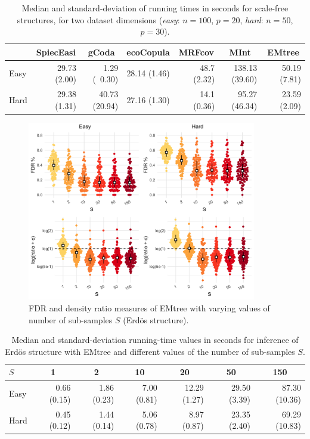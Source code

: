 \newpage

\begin{table}[ht]
\centering
\begin{tabular}{lrrrrrr}
 & \multicolumn{1}{c}{SpiecEasi} & \multicolumn{1}{c}{gCoda} & \multicolumn{1}{c}{ecoCopula} & \multicolumn{1}{c}{MRFcov} & \multicolumn{1}{c}{MInt} & \multicolumn{1}{c}{EMtree} \\ 
  \hline
Easy & 29.73  (2.00) & ~1.29  (~0.30) & 28.14  (1.46) & 48.7  (2.32) & 138.13  (39.60) & 50.19  (7.81) \\ 
  Hard & 29.38  (1.31) & 40.73  (20.94) & 27.16  (1.30) & 14.1  (0.36) & ~95.27  (46.34) & 23.59  (2.09) \\ 
   \hline
\end{tabular}
\caption{Median and standard-deviation of running times in seconds  for scale-free structures, for two dataset dimensions (\textit{easy}: $n=100$, $p=20$, \textit{hard}: $n=50$, $p=30$). }
\label{timeSF}
\end{table}

\vspace{1.5cm}

\begin{figure}[H]
    \centering
    \includegraphics[width=10cm]{figs/S_effect.png}
    \caption{FDR and density ratio measures of EMtree with varying values of number of sub-samples $S$ (Erdös structure).}
    \label{Seffect}
\end{figure}


\begin{table}[ht]
\centering
\begin{tabular}{l|rrrrrr}
  $S$ & \multicolumn{1}{c}{1} & \multicolumn{1}{c}{2} & \multicolumn{1}{c}{10} & \multicolumn{1}{c}{20} & \multicolumn{1}{c}{50} & \multicolumn{1}{c}{150} \\ \hline
  Easy & 0.66  (0.15) & 1.86  (0.23) & 7.00  (0.81) & 12.29  (1.27) & 29.50  (3.39) & 87.30  (10.36) \\ 
  Hard & 0.45  (0.12) & 1.44  (0.14) & 5.06  (0.78) & 8.97  (0.87) & 23.35  (2.40) & 69.29  (10.83) \\ 
   \hline
\end{tabular}
\caption{Median and standard-deviation running-time values in seconds for inference of Erdös structure with EMtree and different values of the number of sub-samples $S$.}
\label{timesS}
\end{table}


